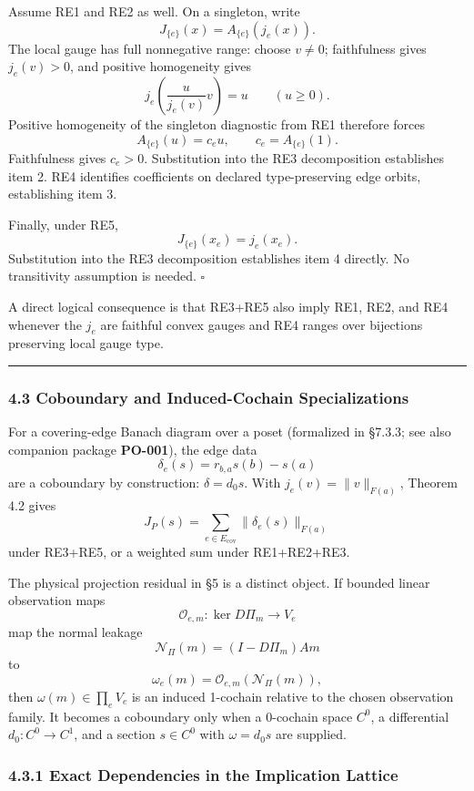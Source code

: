 \documentclass[
  11pt,
]{article}
\begin{document}
Assume RE1 and RE2 as well. On a singleton, write
\[
J_{\{e\}}(x)=A_{\{e\}}(j_e(x)).
\]
The local gauge has full nonnegative range: choose \(v\ne0\); faithfulness gives \(j_e(v)>0\), and positive homogeneity gives
\[
j_e\!\left(\frac{u}{j_e(v)}v\right)=u
\qquad (u\ge0).
\]
Positive homogeneity of the singleton diagnostic from RE1 therefore forces
\[
A_{\{e\}}(u)=c_eu,
\qquad
c_e=A_{\{e\}}(1).
\]
Faithfulness gives \(c_e>0\). Substitution into the RE3 decomposition establishes item 2. RE4 identifies coefficients on declared type-preserving edge orbits, establishing item 3.

Finally, under RE5,
\[
J_{\{e\}}(x_e)=j_e(x_e).
\]
Substitution into the RE3 decomposition establishes item 4 directly. No transitivity assumption is needed. \(\square\)

A direct logical consequence is that RE3+RE5 also imply RE1, RE2, and RE4 whenever the \(j_e\) are faithful convex gauges and RE4 ranges over bijections preserving local gauge type.

\begin{center}\rule{0.5\linewidth}{0.5pt}\end{center}

\subsubsection{4.3 Coboundary and Induced-Cochain Specializations}\label{coboundary-and-induced-cochain-specializations}

For a covering-edge Banach diagram over a poset (formalized in §7.3.3; see also companion package \textbf{PO-001}), the edge data
\[
\delta_e(s)=r_{b,a}s(b)-s(a)
\]
are a coboundary by construction: \(\delta=d_0s\). With \(j_e(v)=\lVert v\rVert_{F(a)}\), Theorem 4.2 gives
\[
J_P(s)=\sum_{e\in E_{\mathrm{cov}}}\lVert\delta_e(s)\rVert_{F(a)}
\]
under RE3+RE5, or a weighted sum under RE1+RE2+RE3.

The physical projection residual in §5 is a distinct object. If bounded linear observation maps
\[
\mathcal O_{e,m}:\ker D\Pi_m\longrightarrow V_e
\]
map the normal leakage
\[
\mathcal N_\Pi(m)=(I-D\Pi_m)Am
\]
to
\[
\omega_e(m)=\mathcal O_{e,m}(\mathcal N_\Pi(m)),
\]
then \(\omega(m)\in\prod_eV_e\) is an induced 1-cochain relative to the chosen observation family. It becomes a coboundary only when a 0-cochain space \(C^0\), a differential \(d_0:C^0\to C^1\), and a section \(s\in C^0\) with \(\omega=d_0s\) are supplied.

\subsubsection{4.3.1 Exact Dependencies in the Implication Lattice}\label{exact-dependencies-in-the-implication-lattice}
\end{document}
